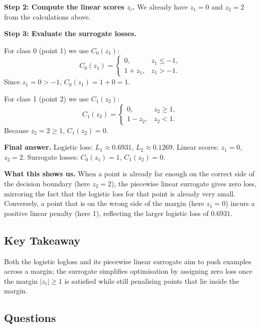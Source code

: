\documentclass[12pt, a4paper]{article}
\begin{document}
\textbf{Step 2: Compute the linear scores \(z_i\).}  
We already have \(z_1 = 0\) and \(z_2 = 2\) from the calculations above.

\textbf{Step 3: Evaluate the surrogate losses.}  

For class 0 (point 1) we use \(C_0(z_1)\):
\[
C_0(z_1) = 
\begin{cases}
0, & z_1 \le -1,\\
1 + z_1, & z_1 > -1.
\end{cases}
\]
Since \(z_1 = 0 > -1\), \(C_0(z_1) = 1 + 0 = 1.\)

For class 1 (point 2) we use \(C_1(z_2)\):
\[
C_1(z_2) = 
\begin{cases}
0, & z_2 \ge 1,\\
1 - z_2, & z_2 < 1.
\end{cases}
\]
Because \(z_2 = 2 \ge 1\), \(C_1(z_2) = 0.\)

\textbf{Final answer.}  
Logistic loss: \(L_1 \approx 0.6931\), \(L_2 \approx 0.1269\).  
Linear scores: \(z_1 = 0\), \(z_2 = 2\).  
Surrogate losses: \(C_0(z_1) = 1\), \(C_1(z_2) = 0\).

\textbf{What this shows us.}  
When a point is already far enough on the correct side of the decision boundary (here \(z_2 = 2\)), the piecewise linear surrogate gives zero loss, mirroring the fact that the logistic loss for that point is already very small.  
Conversely, a point that is on the wrong side of the margin (here \(z_1 = 0\)) incurs a positive linear penalty (here 1), reflecting the larger logistic loss of \(0.6931\).

\subsection{Key Takeaway}
Both the logistic logloss and its piecewise linear surrogate aim to push examples across a margin; the surrogate simplifies optimisation by assigning zero loss once the margin \(|z_i|\ge 1\) is satisfied while still penalising points that lie inside the margin.

\subsection*{Questions}

\newpage

\newpage
\end{document}
